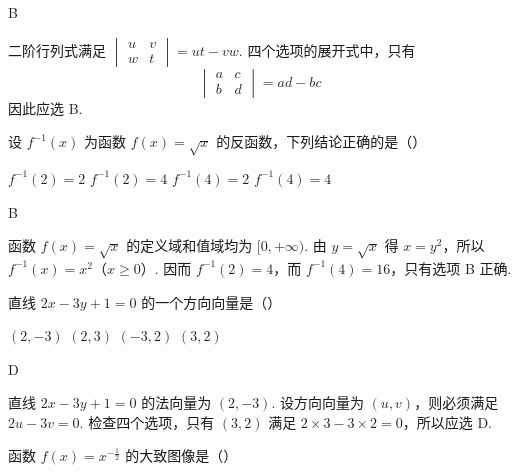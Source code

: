\begin{answer}
B
\end{answer}

\begin{solution}
二阶行列式满足 \(\begin{vmatrix}u&v\\w&t\end{vmatrix}=ut-vw\). 四个选项的展开式中，只有
\[
\begin{vmatrix}a&c\\b&d\end{vmatrix}=ad-bc
\]
因此应选 B.
\end{solution}

\begin{problem}
设 \( f^{-1}(x) \) 为函数 \( f(x)=\sqrt{x} \) 的反函数，下列结论正确的是（\quad）

\choices
    {\( f^{-1}(2)=2 \)}
    {\( f^{-1}(2)=4 \)}
    {\( f^{-1}(4)=2 \)}
    {\( f^{-1}(4)=4 \)}
\end{problem}

\begin{answer}
B
\end{answer}

\begin{solution}
函数 \(f(x)=\sqrt{x}\) 的定义域和值域均为 \([0,+\infty)\). 由 \(y=\sqrt{x}\) 得 \(x=y^2\)，所以 \(f^{-1}(x)=x^2\)（\(x\ge0\)）. 因而 \(f^{-1}(2)=4\)，而 \(f^{-1}(4)=16\)，只有选项 B 正确.
\end{solution}

\begin{problem}
直线 \( 2x - 3y + 1 = 0 \) 的一个方向向量是（\quad）

\choices
    {\( (2, -3) \)}
    {\( (2, 3) \)}
    {\( (-3, 2) \)}
    {\( (3, 2) \)}
\end{problem}

\begin{answer}
D
\end{answer}

\begin{solution}
直线 \(2x-3y+1=0\) 的法向量为 \((2,-3)\). 设方向向量为 \((u,v)\)，则必须满足 \(2u-3v=0\). 检查四个选项，只有 \((3,2)\) 满足 \(2\times3-3\times2=0\)，所以应选 D.
\end{solution}

\begin{problem}
函数 \( f(x)=x^{-\frac{1}{2}} \) 的大致图像是（\quad）

    {}
    {}
    {}
\end{problem}

